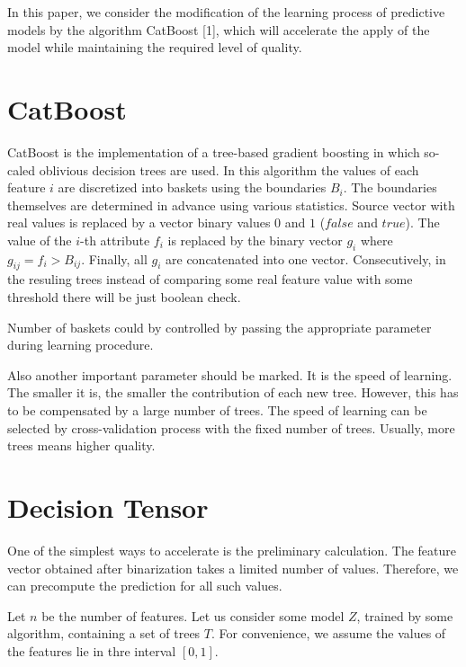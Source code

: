 \documentclass[a4paper]{jpconf}
\begin{document}
In this paper, we consider the modification of the learning process of predictive models by the algorithm CatBoost [1], which will accelerate the apply of the model while maintaining the required level of quality.

\section{CatBoost}

CatBoost is the implementation of a tree-based gradient boosting in which so-caled oblivious decision trees are used. In this algorithm the values of each feature $i$ are discretized into baskets using the boundaries $B_i$. The boundaries themselves are determined in advance using various statistics.
Source vector with real values is replaced by a vector binary values $0$ and $1$ ($false$ and $true$). The value of the $i$-th attribute $f_i$ is replaced by the binary vector $g_i$ where $g_{ij} = f_i > B_{ij}$. Finally, all $g_i$ are concatenated into one vector. Consecutively, in the resuling trees instead of comparing some real feature value with some threshold there will be just boolean check.

Number of baskets could by controlled by passing the appropriate parameter during learning procedure.

Also another important parameter should be marked. It is the speed of learning. The smaller it is, the smaller the contribution of each new tree. However, this has to be compensated by a large number of trees. The speed of learning can be selected by cross-validation process with the fixed number of trees.
Usually, more trees means higher quality.

\section{Decision Tensor}
One of the simplest ways to accelerate is the preliminary calculation. The feature vector obtained after binarization takes a limited number of values. Therefore, we can precompute the prediction for all such values.

Let $n$ be the number of features. Let us consider some model $Z$, trained by some algorithm, containing a set of trees $T$. For convenience, we assume the values of the features lie in thre interval $[0, 1]$.
\end{document}
